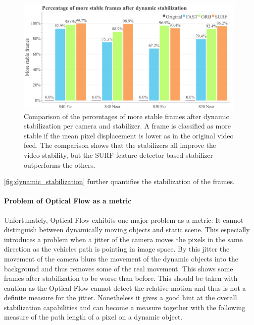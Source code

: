 \begin{figure}[!ht]
      \includegraphics[width=\linewidth]{diagrams/optical_flow/stats.png}    
    \caption{
        Comparison of the percentages of more stable frames after dynamic stabilization per camera and stabilizer.
        A frame is classified as more stable if the mean pixel displacement is lower as in the original video feed. 
        The comparison shows that the stabilizers all improve the video stability, but the SURF \cite{bay10.1007/11744023_32,opencv_library} feature detector based stabilizer outperforms the others.          
    }
    \label{fig:dynamic_stabilization}
\end{figure}

\autoref{fig:dynamic_stabilization} further quantifies the stabilization of the frames.

\paragraph{Problem of Optical Flow as a metric}
\label{sec:evaluation_dynamic_stabilization_optical_flow_problem}
Unfortunately, Optical Flow exhibits one major problem as a metric: 
It cannot distinguish between dynamically moving objects and static scene.
This especially introduces a problem when a jitter of the camera moves the pixels in the same direction as the vehicles path is pointing in image space.
By this jitter the movement of the camera blurs the movement of the dynamic objects into the background and thus removes some of the real movement.
This shows some frames after stabilization to be worse than before. 
This should be taken with caution as the Optical Flow cannot detect the relative motion and thus is not a definite measure for the jitter.
Nonetheless it gives a good hint at the overall stabilization capabilities and can become a measure together with the following measure of the path length of a pixel on a dynamic object. 

